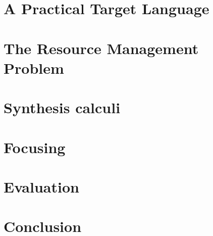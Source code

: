 

\section{A Practical Target Language}
\label{sec:linear-base-calculus}


\section{The Resource Management Problem}
\label{sec:resource-management}


\section{Synthesis calculi}
\label{sec:linear-base-synthesis}


\section{Focusing}
\label{sec:linear-base-focusing}


\section{Evaluation}
\label{sec:linear-base-evaluation}


\section{Conclusion}
\label{sec:linear-base-conclusion}
